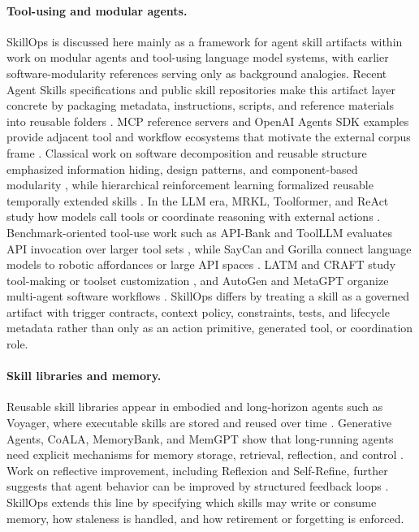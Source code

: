 \documentclass[11pt]{article}
\begin{document}
\paragraph{Tool-using and modular agents.}

SkillOps is discussed here mainly as a framework for agent skill artifacts
within work on modular agents and tool-using language model systems, with
earlier software-modularity references serving only as background analogies.
Recent Agent Skills specifications and public skill repositories make this
artifact layer concrete by packaging metadata, instructions, scripts, and
reference materials into reusable folders
\citep{agentskills2026spec,anthropic2026skills}. MCP reference servers and
OpenAI Agents SDK examples provide adjacent tool and workflow ecosystems that
motivate the external corpus frame
\citep{modelcontextprotocol2026servers,openai2026agentspython,openai2026agentsjs}.
Classical work on software decomposition and reusable structure emphasized
information hiding, design patterns, and component-based modularity
\citep{parnas1972criteria,gamma1994design,szyperski2002component}, while
hierarchical reinforcement learning formalized reusable temporally extended
skills \citep{sutton1999options,dietterich2000maxq}. In the LLM era, MRKL,
Toolformer, and ReAct study how models call tools or coordinate reasoning with
external actions \citep{karpas2022mrkl,schick2023toolformer,yao2023react}.
Benchmark-oriented tool-use work such as API-Bank and ToolLLM evaluates API
invocation over larger tool sets \citep{li2023apibank,qin2024toolllm}, while
SayCan and Gorilla connect language models to robotic affordances or large API
spaces \citep{ichter2023saycan,patil2024gorilla}. LATM and CRAFT study
tool-making or toolset customization \citep{cai2024latm,yuan2024craft}, and
AutoGen and MetaGPT organize multi-agent software workflows
\citep{wu2024autogen,hong2024metagpt}. SkillOps differs by treating a skill as
a governed artifact with trigger contracts, context policy, constraints, tests,
and lifecycle metadata rather than only as an action primitive, generated tool,
or coordination role.

\paragraph{Skill libraries and memory.}

Reusable skill libraries appear in embodied and long-horizon agents such as
Voyager, where executable skills are stored and reused over time
\citep{wang2024voyager}. Generative Agents, CoALA, MemoryBank, and MemGPT show
that long-running agents need explicit mechanisms for memory storage,
retrieval, reflection, and control
\citep{park2023generativeagents,sumers2024coala,zhong2024memorybank,packer2023memgpt}.
Work on reflective improvement, including Reflexion and Self-Refine, further
suggests that agent behavior can be improved by structured feedback loops
\citep{shinn2023reflexion,madaan2023selfrefine}. SkillOps extends this line by
specifying which skills may write or consume memory, how staleness is handled,
and how retirement or forgetting is enforced.
\end{document}
